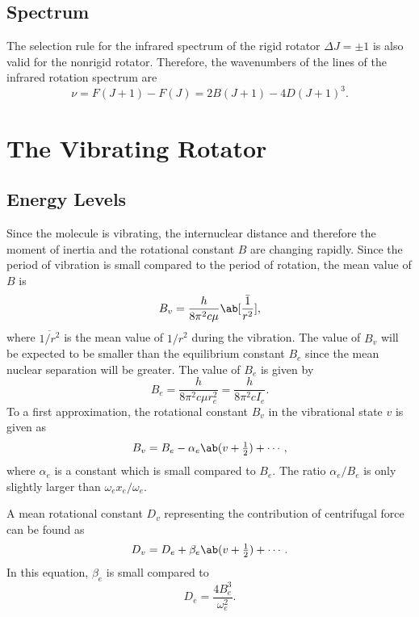 \subsection{Spectrum}

The selection rule for the infrared spectrum of the rigid rotator $\Delta{}J = \pm 1$ is also valid for the nonrigid rotator. Therefore, the wavenumbers of the lines of the infrared rotation spectrum are
\begin{equation*}
    \nu = F(J + 1) - F(J) = 2B(J + 1) - 4D(J + 1)^3.
\end{equation*}

\section{The Vibrating Rotator}
\label{s:the_vibrating_rotator}

\subsection{Energy Levels}

Since the molecule is vibrating, the internuclear distance and therefore the moment of inertia and the rotational constant $B$ are changing rapidly. Since the period of vibration is small compared to the period of rotation, the mean value of $B$ is
\begin{equation*}
    B_v = \frac{h}{8\pi^2c\mu}\ab[\bar{\frac{1}{r^2}}],
\end{equation*}
where $\overline{1/r^2}$ is the mean value of $1/r^2$ during the vibration. The value of $B_v$ will be expected to be smaller than the equilibrium constant $B_e$ since the mean nuclear separation will be greater. The value of $B_e$ is given by
\begin{equation*}
    B_e = \frac{h}{8\pi^2c\mu{}r_e^2} = \frac{h}{8\pi^2cI_e}.
\end{equation*}
To a first approximation, the rotational constant $B_v$ in the vibrational state $v$ is given as
\begin{equation*}
    B_v = B_e - \alpha_e\ab(v + \tfrac{1}{2}) + \dotsb,
\end{equation*}
where $\alpha_e$ is a constant which is small compared to $B_e$. The ratio $\alpha_e/B_e$ is only slightly larger than $\omega_ex_e/\omega_e$.

A mean rotational constant $D_v$ representing the contribution of centrifugal force can be found as
\begin{equation*}
    D_v = D_e + \beta_e\ab(v + \tfrac{1}{2}) + \dotsb.
\end{equation*}
In this equation, $\beta_e$ is small compared to
\begin{equation*}
    D_e = \frac{4B_e^3}{\omega_e^2}.
\end{equation*}

